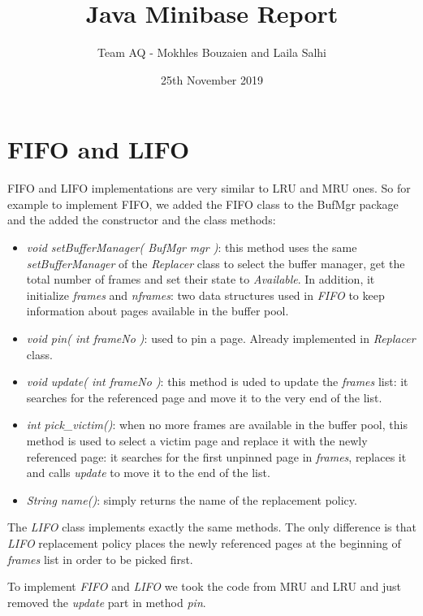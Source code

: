 \documentclass{article}
\title{Java Minibase Report}
\author{Team AQ - Mokhles Bouzaien and Laila Salhi}
\date{25th November 2019}
\begin{document}
\maketitle

\section{FIFO and LIFO}
FIFO and LIFO implementations are very similar to LRU and MRU ones. So for example to implement FIFO, we added the FIFO class to the BufMgr package and the added the constructor and the class methods:
\begin{itemize}
  \item \textit{void setBufferManager( BufMgr mgr )}: this method uses the same \textit{setBufferManager} of the \textit{Replacer} class to select the buffer manager, get the total number of frames and set their state to \textit{Available}. In addition, it initialize \textit{frames} and \textit{nframes}: two data structures used in \textit{FIFO} to keep information about pages available in the buffer pool.
  \item \textit{void pin( int frameNo )}: used to pin a page. Already implemented in \textit{Replacer} class.
  \item \textit{void update( int frameNo )}: this method is uded to update the \textit{frames} list: it searches for the referenced page and move it to the very end of the list.
  \item \textit{int pick\_victim()}: when no more frames are available in the buffer pool, this method is used to select a victim page and replace it with the newly referenced page: it searches for the first unpinned page in \textit{frames}, replaces it and calls \textit{update} to move it to the end of the list.
  \item \textit{String name()}: simply returns the name of the replacement policy.
\end{itemize}
The \textit{LIFO} class implements exactly the same methods. The only difference is that \textit{LIFO} replacement policy places the newly referenced pages at the beginning of \textit{frames} list in order to be picked first.

To implement \textit{FIFO} and \textit{LIFO} we took the code from MRU and LRU and just removed the  \textit{update} part in method \textit{pin}.
\end{document}
